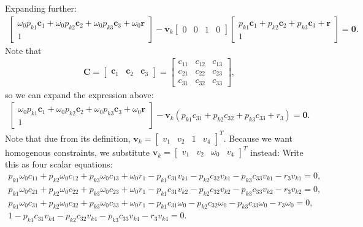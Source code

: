 \documentclass{article}
\begin{document}
Expanding further:
\begin{align}
    \begin{bmatrix}\omega_0 p_{k1} \mathbf{c}_1 + \omega_0 p_{k2} \mathbf{c}_2 + \omega_0 p_{k3} \mathbf{c}_3 + \omega_0 \mathbf{r} \\ 1\end{bmatrix} - \mathbf{v}_k \begin{bmatrix} 0 & 0 & 1 & 0 \end{bmatrix} \begin{bmatrix} p_{k1} \mathbf{c}_1 + p_{k2} \mathbf{c}_2 + p_{k3} \mathbf{c}_3 + \mathbf{r} \\ 1\end{bmatrix} = \mathbf{0}.
\end{align}
Note that
\begin{align}
    \mathbf{C} = \begin{bmatrix} \mathbf{c}_1 & \mathbf{c}_2 & \mathbf{c}_3\end{bmatrix} = \begin{bmatrix} c_{11} & c_{12} & c_{13} \\ c_{21} & c_{22} & c_{23} \\ c_{31} & c_{32} & c_{33} \end{bmatrix},
\end{align}
so we can expand the expression above:
\begin{align}
    \begin{bmatrix}\omega_0 p_{k1} \mathbf{c}_1 + \omega_0 p_{k2} \mathbf{c}_2 + \omega_0 p_{k3} \mathbf{c}_3 + \omega_0 \mathbf{r} \\ 1\end{bmatrix} - \mathbf{v}_k (p_{k1}c_{31} + p_{k2} c_{32} + p_{k3} c_{33} + r_3) = \mathbf{0}.
\end{align}
Note that due from its definition, $\mathbf{v}_k = \begin{bmatrix} v_1 & v_2 & 1 & v_4 \end{bmatrix}^T$. Because we want homogenous
constraints, we substitute $\mathbf{v}_k = \begin{bmatrix} v_1 & v_2 & \omega_0 & v_4 \end{bmatrix}^T$ instead:
Write this as four scalar equations:
\begin{align}
    p_{k1} \omega_0 c_{11} + p_{k2} \omega_0 c_{12} + p_{k3} \omega_0 c_{13} + \omega_0 r_1 - p_{k1} c_{31} v_{k1}- p_{k2} c_{32} v_{k1} - p_{k3} c_{33} v_{k1} - r_3 v_{k1}= 0,\\
    p_{k1} \omega_0 c_{21} + p_{k2} \omega_0 c_{22} + p_{k3} \omega_0 c_{23} + \omega_0 r_1 - p_{k1} c_{31} v_{k2}- p_{k2} c_{32} v_{k2} - p_{k3} c_{33} v_{k2} - r_3 v_{k2}= 0,\\
    p_{k1} \omega_0 c_{31} + p_{k2} \omega_0 c_{32} + p_{k3} \omega_0 c_{33} + \omega_0 r_1 - p_{k1} c_{31} \omega_0- p_{k2} c_{32} \omega_0 - p_{k3} c_{33} \omega_0 - r_3 \omega_0 = 0,\\
    1 - p_{k1} c_{31} v_{k4}- p_{k2} c_{32} v_{k4} - p_{k3} c_{33} v_{k4} - r_3 v_{k4}= 0.
\end{align}
\end{document}
